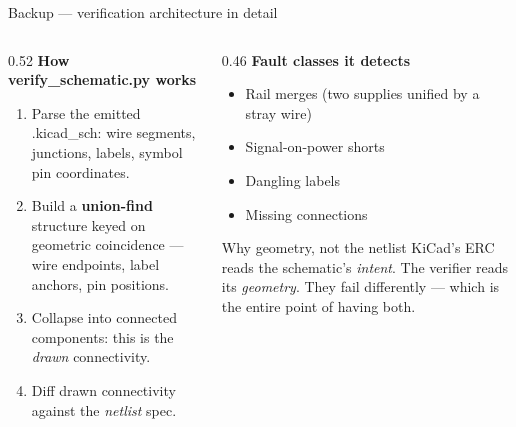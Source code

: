 \documentclass[aspectratio=169,10pt]{beamer}
\newcommand{\code}[1]{{\ttfamily\small #1}}
\begin{document}
\begin{frame}{Backup --- verification architecture in detail}
\vspace{2mm}
\begin{columns}[T]
\begin{column}{0.52\textwidth}
\textbf{How \code{verify\_schematic.py} works}
\begin{enumerate}\small
  \item Parse the emitted \code{.kicad\_sch}: wire segments, junctions, labels, symbol pin coordinates.
  \item Build a \textbf{union-find} structure keyed on geometric coincidence --- wire endpoints, label anchors, pin positions.
  \item Collapse into connected components: this is the \emph{drawn} connectivity.
  \item Diff drawn connectivity against the \emph{netlist} spec.
\end{enumerate}
\end{column}
\begin{column}{0.46\textwidth}
\textbf{Fault classes it detects}
\begin{itemize}\small
  \item Rail merges (two supplies unified by a stray wire)
  \item Signal-on-power shorts
  \item Dangling labels
  \item Missing connections
\end{itemize}
\vspace{2mm}
\begin{block}{Why geometry, not the netlist}
\small
KiCad's ERC reads the schematic's \emph{intent}. The verifier reads its \emph{geometry}. They fail differently --- which is the entire point of having both.
\end{block}
\end{column}
\end{columns}
\end{frame}
\end{document}
